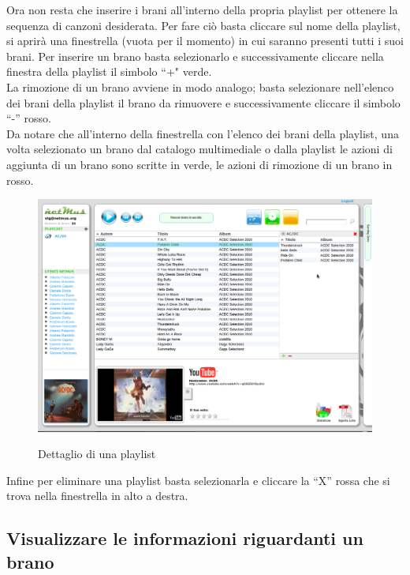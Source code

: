 Ora non resta che inserire i brani all'interno della propria playlist
per ottenere la sequenza di canzoni desiderata. Per fare ci\`o basta cliccare sul
nome della playlist, si aprir\`a una finestrella (vuota per il momento) in cui
saranno presenti tutti i suoi brani. Per inserire un brano basta
selezionarlo e successivamente cliccare nella finestra della playlist il
simbolo ``+" verde.\\
La rimozione di un brano avviene in modo analogo; basta selezionare
nell'elenco dei brani della playlist il brano da rimuovere e successivamente
cliccare il simbolo ``-'' rosso.\\
Da notare che all'interno della finestrella con l'elenco dei brani della
playlist, una volta selezionato un brano dal catalogo multimediale o dalla
playlist le azioni di aggiunta di un brano sono scritte in verde, le azioni di
rimozione di un brano in rosso.\\
\begin{figure}[htbp]
  \centering
  \includegraphics[width=15cm]{img/MU/playlist_song.png}\\
\caption{Dettaglio di una playlist}
\end{figure}

Infine per eliminare una playlist basta selezionarla e cliccare la ``X'' rossa che
si trova nella finestrella in alto a destra.

\subsection*{Visualizzare le informazioni riguardanti un brano}

